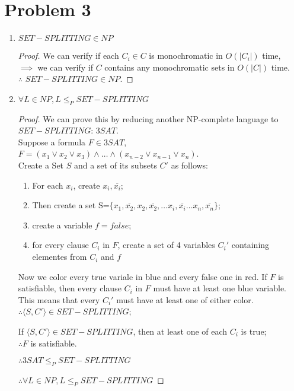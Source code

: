 \documentclass[letterpaper]{article}
\begin{document}
\section*{Problem 3}
\begin{enumerate}
    \item $SET-SPLITTING \in NP$ \begin{proof}
        We can verify if each $C_i \in C$ is monochromatic in $O(|C_i|)$ time, \\
        $\implies$ we can verify if $C$ contains any monochromatic sets in $O(|C|)$ time.\\
        $\therefore$ $SET-SPLITTING \in NP$.
    \end{proof}
    \item $\forall L \in NP, L \leq_P SET-SPLITTING$ \begin{proof}
        We can prove this by reducing another NP-complete language to $SET-SPLITTING$: $3SAT$.\\
        Suppose a formula $F \in 3SAT$, $F=(x_1 \lor x_2 \lor x_3) \land \dots \land (x_{n-2} \lor x_{n-1} \lor x_n)$.\\
        Create a Set $S$ and a set of its subsets $C'$ as follows:
        \begin{enumerate}
            \item For each $x_i$, create $ x_i, \overline{x_i}$;
            \item Then create a set S=$\{x_1, \overline{x_2}, x_2, \overline{x_2},\dots x_i, \overline{x_i}\dots x_n, \overline{x_n}\}$;
            \item create a variable $f=false$; 
            \item for every clause $C_i$ in $F$, create a set of 4 variables $C_i'$ containing elementes from $C_i$ and $f$
        \end{enumerate}
        Now we color every true variale in blue and every false one in red.
        If $F$ is satisfiable, then every clause $C_i$ in $F$ must have at least one blue variable. This means that every $C_i'$ must have at least one of either color.\\
        $\therefore \langle S, C' \rangle \in SET-SPLITTING$;

        If $\langle S, C' \rangle \in SET-SPLITTING$, then at least one of each $C_i$ is true;\\
        $\therefore F$ is satisfiable.

        $\therefore 3SAT \leq_P SET-SPLITTING$ 
        
        $\therefore \forall L \in NP, L \leq_P SET-SPLITTING$
    \end{proof}
\end{enumerate}
\end{document}
